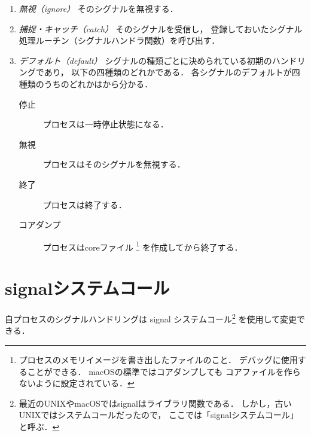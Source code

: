 \begin{enumerate}
\item \emph{無視（ignore）}
  そのシグナルを無視する．

\item \emph{捕捉・キャッチ（catch）}
  そのシグナルを受信し，
  登録しておいたシグナル処理ルーチン（シグナルハンドラ関数）を呼び出す．

\item \emph{デフォルト（default）}
  シグナルの種類ごとに決められている初期のハンドリングであり，
  以下の四種類のどれかである．
  各シグナルのデフォルトが四種類のうちのどれかはから分かる．

  \begin{description}
  \item[停止] プロセスは一時停止状態になる．
  \item[無視] プロセスはそのシグナルを無視する．
  \item[終了] プロセスは終了する．
  \item[コアダンプ] プロセスはcoreファイル
    \footnote{プロセスのメモリイメージを書き出したファイルのこと．
      デバッグに使用することができる．
      macOSの標準ではコアダンプしても
      コアファイルを作らないように設定されている．}
    を作成してから終了する．
  \end{description}
\end{enumerate}

\section{signalシステムコール}
自プロセスのシグナルハンドリングは signal システムコール\footnote{
  最近のUNIXやmacOSではsignalはライブラリ関数である．
  しかし，古いUNIXではシステムコールだったので，
  ここでは「signalシステムコール」と呼ぶ．}
を使用して変更できる．

